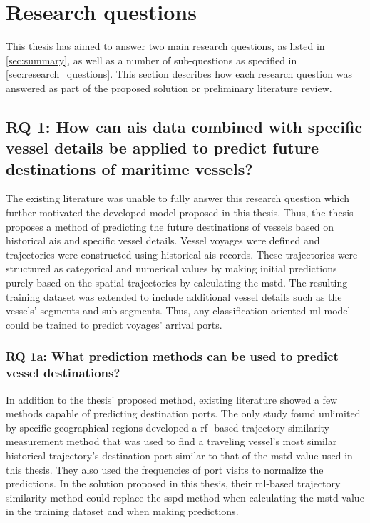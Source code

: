 \section{Research questions}

This thesis has aimed to answer two main research questions, as listed in \cref{sec:summary}, as well as a number of sub-questions as specified in \cref{sec:research_questions}. This section describes how each research question was answered as part of the proposed solution or preliminary literature review.

\subsection{RQ 1: How can \acrshort{ais} data combined with specific vessel details be applied to predict future destinations of maritime vessels?}

The existing literature was unable to fully answer this research question which further motivated the developed model proposed in this thesis. Thus, the thesis proposes a method of predicting the future destinations of vessels based on historical \acrshort{ais} and specific vessel details. Vessel voyages were defined and trajectories were constructed using historical \acrshort{ais} records. These trajectories were structured as categorical and numerical values by making initial predictions purely based on the spatial trajectories by calculating the \acrfull{mstd}. The resulting training dataset was extended to include additional vessel details such as the vessels' segments and sub-segments. Thus, any classification-oriented \acrshort{ml} model could be trained to predict voyages' arrival ports.

\subsubsection{RQ 1a: What prediction methods can be used to predict vessel destinations?}

In addition to the thesis' proposed method, existing literature showed a few methods capable of predicting destination ports. The only study found unlimited by specific geographical regions developed a \acrfull{rf} -based trajectory similarity measurement method that was used to find a traveling vessel's most similar historical trajectory's destination port similar to that of the \acrshort{mstd} value used in this thesis. They also used the frequencies of port visits to normalize the predictions. In the solution proposed in this thesis, their \acrshort{ml}-based trajectory similarity method could replace the \acrshort{sspd} method when calculating the \acrshort{mstd} value in the training dataset and when making predictions.

